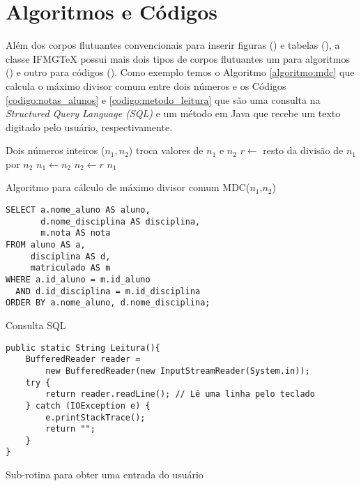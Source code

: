 \section{Algoritmos e Códigos} \label{secao:algoritmos_e_codigos}

Além dos corpos flutuantes convencionais para inserir figuras () e tabelas (), a classe {IFMG\TeX} possui mais dois tipos de corpos flutuantes um para algoritmos () e outro para códigos (). Como exemplo temos o Algoritmo \ref{algoritmo:mdc} que calcula o máximo divisor comum entre dois números e os Códigos \ref{codigo:notas_alunos} e \ref{codigo:metodo_leitura} que são uma consulta na \textit{Structured Query Language (SQL)} e um método em Java que recebe um texto digitado pelo usuário, respectivamente.

\begin{algoritmo}[!htb]
\begin{algorithmic}[1]
 \Require Dois números inteiros ($n_1, n_2$)
  
   \State troca valores de $n_1$ e $n_2$
 \EndIf
 \Repeat
   \State $r \leftarrow$ resto da divisão de $n_1$ por $n_2$
   \State $n_1 \leftarrow n_2$
   \State $n_2 \leftarrow r$
 \Return $n_1$
\end{algorithmic}
\caption{Algoritmo para cálculo de máximo divisor comum MDC($n_1$,$n_2$)}
\label{algoritmo:mdc}
\end{algoritmo}

\begin{codigo}[!htb]
\begin{Verbatim}
SELECT a.nome_aluno AS aluno,
       d.nome_disciplina AS disciplina,
       m.nota AS nota
FROM aluno AS a,
     disciplina AS d,
     matriculado AS m
WHERE a.id_aluno = m.id_aluno
  AND d.id_disciplina = m.id_disciplina
ORDER BY a.nome_aluno, d.nome_disciplina;
\end{Verbatim}
\caption{Consulta SQL} \label{codigo:notas_alunos}
\end{codigo}

\begin{codigo}[!htb]
\begin{Verbatim}
public static String Leitura(){
    BufferedReader reader =
        new BufferedReader(new InputStreamReader(System.in));
    try {
        return reader.readLine(); // Lê uma linha pelo teclado
    } catch (IOException e) {
        e.printStackTrace();
        return "";
    }
}
\end{Verbatim}
\caption{Sub-rotina para obter uma entrada do usuário} \label{codigo:metodo_leitura}
\end{codigo}

